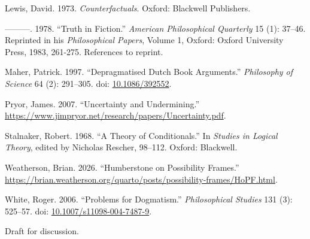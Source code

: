 \documentclass[
  11pt,
  letterpaper,
  DIV=11,
  numbers=noendperiod,
  twoside]{scrartcl}
\newlength{\cslhangindent}
\newenvironment{CSLReferences}[2] %
 {\begin{list}{}{%
  \setlength{\itemindent}{0pt}
  \setlength{\leftmargin}{0pt}
  \setlength{\parsep}{0pt}
  \ifodd #1
   \setlength{\leftmargin}{\cslhangindent}
   \setlength{\itemindent}{-1\cslhangindent}
  \fi
  \setlength{\itemsep}{#2\baselineskip}}}
 {\end{list}}
\begin{document}
\begin{CSLReferences}{1}{0}
Lewis, David. 1973. \emph{Counterfactuals}. Oxford: Blackwell
Publishers.

---------. 1978. {``Truth in Fiction.''} \emph{American Philosophical
Quarterly} 15 (1): 37--46. Reprinted in his \emph{Philosophical Papers},
Volume 1, Oxford: Oxford University Press, 1983, 261-275. References to
reprint.

Maher, Patrick. 1997. {``Depragmatised Dutch Book Arguments.''}
\emph{Philosophy of Science} 64 (2): 291--305. doi:
\href{https://doi.org/10.1086/392552}{10.1086/392552}.

Pryor, James. 2007. {``Uncertainty and Undermining.''}
\url{https://www.jimpryor.net/research/papers/Uncertainty.pdf}.

Stalnaker, Robert. 1968. {``A Theory of Conditionals.''} In
\emph{Studies in Logical Theory}, edited by Nicholas Rescher, 98--112.
Oxford: Blackwell.

Weatherson, Brian. 2026. {``Humberstone on Possibility Frames.''}
\url{https://brian.weatherson.org/quarto/posts/possibility-frames/HoPF.html}.

White, Roger. 2006. {``Problems for Dogmatism.''} \emph{Philosophical
Studies} 131 (3): 525--57. doi:
\href{https://doi.org/10.1007/s11098-004-7487-9}{10.1007/s11098-004-7487-9}.

\end{CSLReferences}



\noindent Draft for discussion.
\end{document}
